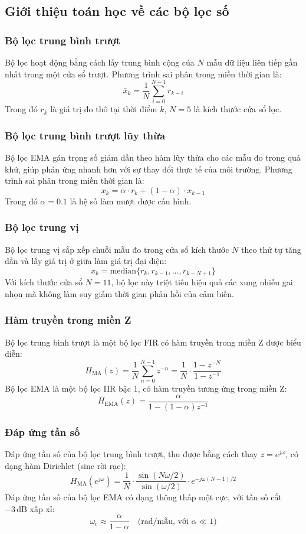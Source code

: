 \documentclass[12pt,a4paper]{article}
\begin{document}
\subsection{Giới thiệu toán học về các bộ lọc số}

\subsubsection{Bộ lọc trung bình trượt}
Bộ lọc hoạt động bằng cách lấy trung bình cộng của $N$ mẫu dữ liệu liên tiếp gần nhất trong một cửa sổ trượt. Phương trình sai phân trong miền thời gian là:
\[
\bar{x}_k = \frac{1}{N}\sum_{i=0}^{N-1} r_{k-i}
\]
Trong đó $r_k$ là giá trị đo thô tại thời điểm $k$, $N = 5$ là kích thước cửa sổ lọc.

\subsubsection{Bộ lọc trung bình trượt lũy thừa}
Bộ lọc EMA gán trọng số giảm dần theo hàm lũy thừa cho các mẫu đo trong quá khứ, giúp phản ứng nhanh hơn với sự thay đổi thực tế của môi trường. Phương trình sai phân trong miền thời gian là:
\[
x_k = \alpha \cdot r_k + (1-\alpha) \cdot x_{k-1}
\]
Trong đó $\alpha = 0.1$ là hệ số làm mượt được cấu hình.

\subsubsection{Bộ lọc trung vị}
Bộ lọc trung vị sắp xếp chuỗi mẫu đo trong cửa sổ kích thước $N$ theo thứ tự tăng dần và lấy giá trị ở giữa làm giá trị đại diện:
\[
x_k = \text{median}\{r_{k}, r_{k-1}, \dots, r_{k-N+1}\}
\]
Với kích thước cửa sổ $N = 11$, bộ lọc này triệt tiêu hiệu quả các xung nhiễu gai nhọn mà không làm suy giảm thời gian phản hồi của cảm biến.

\subsubsection{Hàm truyền trong miền Z}
Bộ lọc trung bình trượt là một bộ lọc FIR có hàm truyền trong miền Z được biểu diễn:
\[
H_{\text{MA}}(z) = \frac{1}{N}\sum_{n=0}^{N-1} z^{-n} = \frac{1}{N} \cdot \frac{1-z^{-N}}{1-z^{-1}}
\]
Bộ lọc EMA là một bộ lọc IIR bậc 1, có hàm truyền tương ứng trong miền Z:
\[
H_{\text{EMA}}(z) = \frac{\alpha}{1-(1-\alpha)z^{-1}}
\]

\subsubsection{Đáp ứng tần số}
Đáp ứng tần số của bộ lọc trung bình trượt, thu được bằng cách thay $z = e^{j\omega}$, có dạng hàm Dirichlet (sinc rời rạc):
\[
H_{\text{MA}}(e^{j\omega}) = \frac{1}{N} \cdot \frac{\sin(N\omega/2)}{\sin(\omega/2)} \cdot e^{-j\omega(N-1)/2}
\]
Đáp ứng tần số của bộ lọc EMA có dạng thông thấp một cực, với tần số cắt $-3\,\text{dB}$ xấp xỉ:
\[
\omega_c \approx \frac{\alpha}{1-\alpha} \quad \text{(rad/mẫu, với } \alpha \ll 1\text{)}
\]
\end{document}
